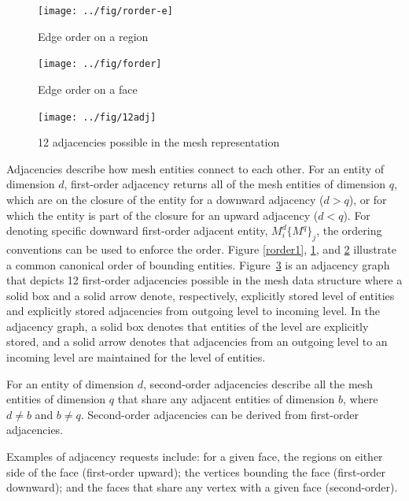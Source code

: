 \begin{figure}
\centering
\texttt{[image: ../fig/rorder-e]}
\caption[Edge order on a region]
{Edge order on a region~\cite{simmetrixweb}}
\label{rorder2}  
\end{figure}

\begin{figure}
\centering
\texttt{[image: ../fig/forder]}
\caption[Edge order on a face]
{Edge order on a face~\cite{simmetrixweb}}
\label{forder}
\end{figure}

\begin{figure}
\centering
\texttt{[image: ../fig/12adj]}
\caption[12 adjacencies possible in the mesh representation]
{12 adjacencies possible in the mesh representation~\cite{garimella02}}
\label{12adj}  %
\end{figure}

Adjacencies describe how mesh entities connect to each other. For
an entity of dimension $d$, first-order adjacency returns all of
the mesh entities of dimension $q$, which are on the closure of the
entity for a downward adjacency ($d>q$), or for which the entity is
part of the closure for an upward adjacency ($d<q$). For denoting specific downward
first-order adjacent entity,
$M^d_i\{M^q\}_j$, the ordering conventions can be used to enforce the
order. Figure \ref{rorder1}, \ref{rorder2}, and \ref{forder} illustrate a
common canonical order of bounding entities. Figure~\ref{12adj} is an
adjacency graph that depicts 12 first-order adjacencies possible in 
the mesh data structure where a solid box and a solid arrow
denote, respectively, explicitly stored level of entities and explicitly stored adjacencies from
outgoing level to incoming level. In the adjacency graph, a solid box denotes that entities of the level are explicitly stored, and a solid arrow denotes that adjacencies from an outgoing level to an incoming level are maintained for the level of entities.

For an entity of dimension $d$, second-order adjacencies describe
all the mesh entities of dimension $q$ that share any adjacent
entities of dimension $b$, where $d \neq b$ and $b \neq q$. Second-order
adjacencies can be derived from first-order adjacencies. 

Examples of adjacency requests include: for a given face, the regions
on either side of the face (first-order upward); the vertices bounding
the face (first-order downward); and the faces that share any vertex
with a given face (second-order). 

